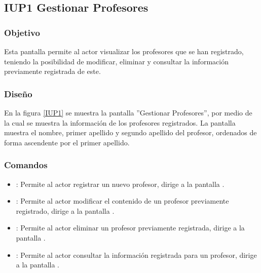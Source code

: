 \subsection{IUP1 Gestionar Profesores}

\subsubsection{Objetivo}
	
	Esta pantalla permite al actor visualizar los profesores que se han registrado, teniendo la posibilidad de modificar, eliminar y consultar la información previamente registrada de este.

\subsubsection{Diseño}

    En la figura \ref{IUP1} se muestra la pantalla ''Gestionar Profesores'', por medio de la cual se muestra la información de los profesores registrados. La pantalla muestra el nombre, primer apellido y segundo apellido del profesor, ordenados de forma ascendente por el primer apellido.
 

\subsubsection{Comandos}
    \begin{itemize}
		\item \btnRegistrar: Permite al actor registrar un nuevo profesor, dirige a la pantalla .
		
		\item {}: Permite al actor modificar el contenido de un profesor previamente registrado, dirige a la pantalla .
		
		\item {}: Permite al actor eliminar un profesor previamente registrada, dirige a la pantalla .
	
		\item {}: Permite al actor consultar la información registrada para un profesor, dirige a la pantalla .
    \end{itemize}
